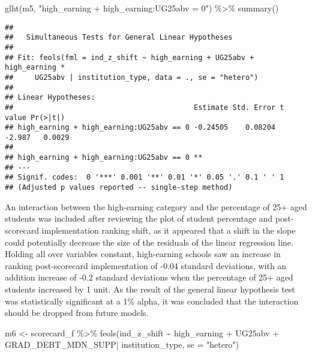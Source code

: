 \documentclass[
]{article}
\newenvironment{Shaded}{\begin{snugshade}}{\end{snugshade}}
\newcommand{\AttributeTok}[1]{\textcolor[rgb]{0.77,0.63,0.00}{#1}}
\newcommand{\FunctionTok}[1]{\textcolor[rgb]{0.00,0.00,0.00}{#1}}
\newcommand{\NormalTok}[1]{#1}
\newcommand{\OtherTok}[1]{\textcolor[rgb]{0.56,0.35,0.01}{#1}}
\newcommand{\SpecialCharTok}[1]{\textcolor[rgb]{0.00,0.00,0.00}{#1}}
\newcommand{\StringTok}[1]{\textcolor[rgb]{0.31,0.60,0.02}{#1}}
\begin{document}
\begin{Shaded}
\begin{Highlighting}[]
\FunctionTok{glht}\NormalTok{(m5, }\StringTok{"high\_earning + high\_earning:UG25abv = 0"}\NormalTok{) }\SpecialCharTok{\%\textgreater{}\%} \FunctionTok{summary}\NormalTok{()}
\end{Highlighting}
\end{Shaded}

\begin{verbatim}
## 
##   Simultaneous Tests for General Linear Hypotheses
## 
## Fit: feols(fml = ind_z_shift ~ high_earning + UG25abv + high_earning * 
##     UG25abv | institution_type, data = ., se = "hetero")
## 
## Linear Hypotheses:
##                                          Estimate Std. Error t value Pr(>|t|)
## high_earning + high_earning:UG25abv == 0 -0.24505    0.08204  -2.987   0.0029
##                                            
## high_earning + high_earning:UG25abv == 0 **
## ---
## Signif. codes:  0 '***' 0.001 '**' 0.01 '*' 0.05 '.' 0.1 ' ' 1
## (Adjusted p values reported -- single-step method)
\end{verbatim}

An interaction between the high-earning category and the percentage of
25+ aged students was included after reviewing the plot of student
percentage and post-scorecard implementation ranking shift, as it
appeared that a shift in the slope could potentially decrease the size
of the residuals of the linear regression line. Holding all over
variables constant, high-earning schools saw an increase in ranking
post-scorecard implementation of -0.04 standard deviations, with an
addition increase of -0.2 standard deviations when the percentage of 25+
aged students increased by 1 unit. As the result of the general linear
hypothesis test was statistically significant at a 1\% alpha, it was
concluded that the interaction should be dropped from future models.

\begin{Shaded}
\begin{Highlighting}[]
\NormalTok{m6 }\OtherTok{\textless{}{-}}\NormalTok{ scorecard\_f }\SpecialCharTok{\%\textgreater{}\%} \FunctionTok{feols}\NormalTok{(ind\_z\_shift }\SpecialCharTok{\textasciitilde{}}\NormalTok{ high\_earning }\SpecialCharTok{+}\NormalTok{ UG25abv }\SpecialCharTok{+}\NormalTok{ GRAD\_DEBT\_MDN\_SUPP}\SpecialCharTok{|}\NormalTok{ institution\_type, }\AttributeTok{se =} \StringTok{"hetero"}\NormalTok{)}
\end{Highlighting}
\end{Shaded}
\end{document}
